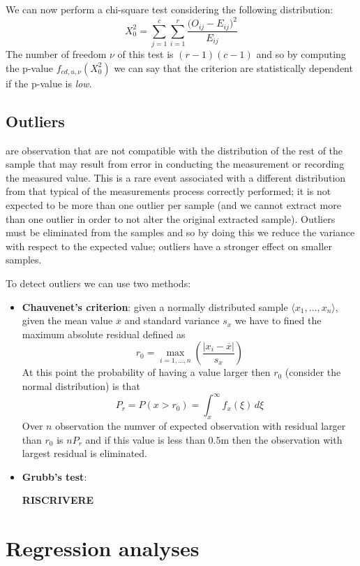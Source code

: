 	We can now perform a chi-square test considering the following distribution:
	\[ X_0^2 = \sum_{j=1}^{c} \sum_{i=1}^{r} \frac{\big(O_{ij}-E_{ij}\big)^2}{E_{ij}} \]
	The number of freedom $\nu$ of this test is $(r-1)(c-1)$ and so by computing the p-value $f_{cd,u,\nu}(X_0^2)$ we can say that the criterion are statistically dependent if the p-value is \textit{low}.
	
	
\subsection{Outliers}
	 are observation that are not compatible with the distribution of the rest of the sample that may result from error in conducting the measurement or recording the measured value. This is a rare event associated with a different distribution from that typical of the measurements process correctly performed; it is not expected to be more than one outlier per sample (and we cannot extract more than one outlier in order to not alter the original extracted sample). Outliers must be eliminated from the samples and so by doing this we reduce the variance with respect to the expected value; outliers have a stronger effect on smaller samples.
	
	To detect outliers we can use two methods:
	\begin{itemize}
		\item \textbf{Chauvenet's criterion}: given a normally distributed sample $\langle x_1,\dots,x_n\rangle$, given the mean value $\overline x$ and standard variance $s_x$ we have to fined the maximum absolute residual defined as
		\[ r_ 0 = \max_{i=1,\dots,n} \left( \frac{|x_i-\overline x|}{s_x} \right) \]
		At this point the probability of having a value larger then $r_0$ (consider the normal distribution) is that
		\[ P_r = P(x>r_0) = \int_x^\infty f_x(\xi)\, d\xi \]
		Over $n$ observation the numver of expected observation with residual larger than $r_0$ is $n P_r$ and if this value is less than $0.5$m then the observation with largest residual is eliminated.
		
		\item \textbf{Grubb's test}:
		
		\textbf{RISCRIVERE}
	\end{itemize}
	
\section{Regression analyses}
	
	
	
	
	
	
	
	
	
	
	
	
	
	
	